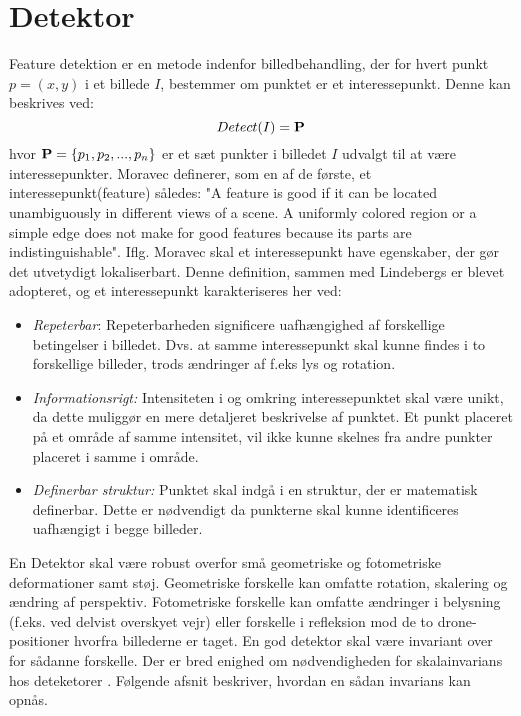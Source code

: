 \section{Detektor}\label{sec:detect}
Feature detektion er en metode indenfor billedbehandling, der for hvert punkt $p = (x,y)$ i et billede $I$, bestemmer om punktet er et interessepunkt. Denne kan beskrives ved:
\begin{equation}
Detect(I)= \bold{P}
\label{detect}
\end{equation}
hvor $\bold{P} = \lbrace p_1, p_2,..., p_n \rbrace$ er et sæt punkter i billedet $I$ udvalgt til at være interessepunkter. Moravec \cite{moravec} definerer, som en af de første, et interessepunkt(feature) således: "A
feature is good if it can be located unambiguously in different views of a scene. A
uniformly colored region or a simple edge does not make for good features because
its parts are indistinguishable". Iflg. Moravec skal et interessepunkt have egenskaber, der gør det utvetydigt lokaliserbart. Denne definition, sammen med Lindebergs \cite{pointsurvey} er blevet adopteret, og et interessepunkt karakteriseres her ved:
\begin{itemize}
\item{\emph{Repeterbar}: Repeterbarheden significere uafhængighed af forskellige betingelser i billedet. Dvs. at samme interessepunkt skal kunne findes i to forskellige billeder, trods ændringer af f.eks lys og rotation.}
\item{\emph{Informationsrigt:}
Intensiteten i og omkring interessepunktet skal være unikt, da dette muliggør en mere detaljeret beskrivelse af punktet. Et punkt placeret på et område af samme intensitet, vil ikke kunne skelnes fra andre punkter placeret i samme i område.}
\item{\textit{Definerbar struktur:} Punktet skal indgå i en struktur, der er matematisk definerbar. Dette er nødvendigt da punkterne skal kunne identificeres uafhængigt i begge billeder.}
\end{itemize}
En Detektor skal være robust overfor små geometriske og fotometriske deformationer samt støj. Geometriske forskelle kan omfatte rotation, skalering og ændring af perspektiv.  Fotometriske forskelle kan omfatte ændringer i belysning (f.eks. ved delvist overskyet vejr) eller forskelle i refleksion mod de to drone-positioner hvorfra billederne er taget. En god detektor skal være invariant over for sådanne forskelle. Der er bred enighed om nødvendigheden for skalainvarians hos deteketorer \cite{koen} \cite{blob} \cite{lindenscale}. Følgende afsnit beskriver, hvordan en sådan invarians kan opnås.
\raggedbottom
\raggedbottom